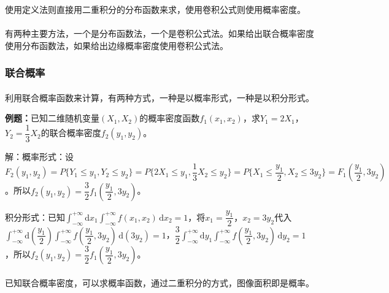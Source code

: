 使用定义法则直接用二重积分的分布函数来求，使用卷积公式则使用概率密度。

\paragraph{}

\paragraph{}

有两种主要方法，一个是分布函数法，一个是卷积公式法。如果给出联合概率密度使用分布函数法，如果给出边缘概率密度使用卷积公式法。

\subsubsection{联合概率}

\paragraph{} \leavevmode \medskip

利用联合概率函数来计算，有两种方式，一种是以概率形式，一种是以积分形式。

\textbf{例题：}已知二维随机变量$(X_1,X_2)$的概率密度函数$f_1(x_1,x_2)$，求$Y_1=2X_1$，$Y_2=\dfrac{1}{3}X_2$的联合概率密度$f_2(y_1,y_2)$。

解：概率形式：设$F_2(y_1,y_2)=P\{Y_1\leqslant y_1,Y_2\leqslant y_2\}=P\{2X_1\leqslant y_1,\dfrac{1}{3}X_2\leqslant y_2\}=P\{X_1\leqslant\dfrac{y_1}{2},X_2\leqslant3y_2\}=F_1(\dfrac{y_1}{2},3y_2)$。所以$f_2(y_1,y_2)=\dfrac{3}{2}f_1(\dfrac{y_1}{2},3y_2)$。

积分形式：已知$\int_{-\infty}^{+\infty}\textrm{d}x_1\int_{-\infty}^{+\infty}f(x_1,x_2)\,\textrm{d}x_2=1$，将$x_1=\dfrac{y_1}{2}$，$x_2=3y_2$代入$\int_{-\infty}^{+\infty}\textrm{d}(\dfrac{y_1}{2})\int_{-\infty}^{+\infty}f(\dfrac{y_1}{2},3y_2)\,\textrm{d}(3y_2)=1$，$\dfrac{3}{2}\int_{-\infty}^{+\infty}\textrm{d}y_1\int_{-\infty}^{+\infty}f(\dfrac{y_1}{2},3y_2)\,\textrm{d}y_2=1$，所以$f_2(y_1,y_2)=\dfrac{3}{2}f_1(\dfrac{y_1}{2},3y_2)$。

\paragraph{} \leavevmode \medskip

已知联合概率密度，可以求概率函数，通过二重积分的方式，图像面积即是概率。

